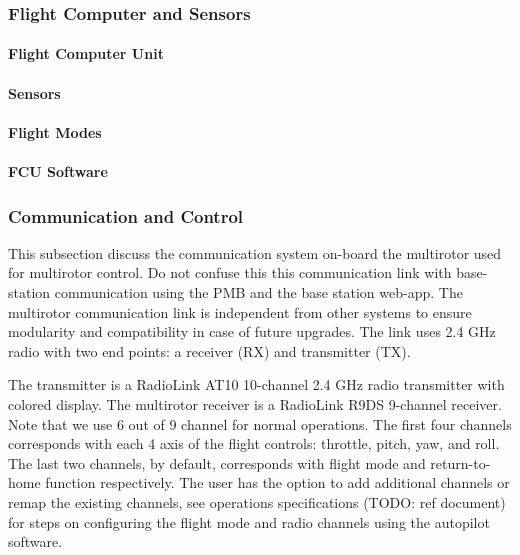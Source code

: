\subsubsection{Flight Computer and Sensors}
\paragraph{Flight Computer Unit}
\paragraph{Sensors}
\paragraph{Flight Modes}
\paragraph{FCU Software}

\subsubsection{Communication and Control}

This subsection discuss the communication system on-board the multirotor used for multirotor control. Do not confuse this this communication link with base-station communication using the PMB and the base station web-app.
The multirotor communication link is independent from other systems to ensure modularity and compatibility in case of future upgrades.
The link uses 2.4 GHz radio with two end points: a receiver (RX) and transmitter (TX).

The transmitter is a RadioLink AT10 10-channel 2.4 GHz radio transmitter with colored display\cite{at10}. The multirotor receiver is a RadioLink R9DS 9-channel receiver\cite{r9ds}. Note that we use 6 out of 9 channel for normal operations.
The first four channels corresponds with each 4 axis of the flight controls: throttle, pitch, yaw, and roll. The last two channels, by default, corresponds with flight mode and return-to-home function respectively. 
The user has the option to add additional channels or remap the existing channels, see operations specifications (TODO: ref document) for steps on configuring the flight mode and radio channels using the autopilot software.
